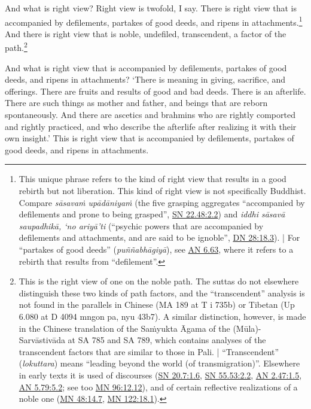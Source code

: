 \documentclass[12pt,openany]{book}%
\begin{document}
And what is right view? Right view is twofold, I say. There is right view that is accompanied by defilements, partakes of good deeds, and ripens in attachments.\footnote{This unique phrase refers to the kind of right view that results in a good rebirth but not liberation. This kind of right view is not specifically Buddhist. Compare \textit{\textsanskrit{sāsavaṁ} \textsanskrit{upādāniyaṁ}} (the five grasping aggregates “accompanied by defilements and prone to being grasped”, \href{https://suttacentral.net/sn22.48/en/sujato\#2.2}{SN 22.48:2.2}) and \textit{iddhi \textsanskrit{sāsavā} \textsanskrit{saupadhikā}, ‘no \textsanskrit{ariyā}’ti} (“psychic powers that are accompanied by defilements and attachments, and are said to be ignoble”, \href{https://suttacentral.net/dn28/en/sujato\#18.3}{DN 28:18.3}). | For “partakes of good deeds” (\textit{\textsanskrit{puññabhāgiyā}}), see \href{https://suttacentral.net/an6.63/en/sujato}{AN 6.63}, where it refers to a rebirth that results from “defilement”. } And there is right view that is noble, undefiled, transcendent, a factor of the path.\footnote{This is the right view of one on the noble path. The suttas do not elsewhere distinguish these two kinds of path factors, and the “transcendent” analysis is not found in the parallels in Chinese (MA 189 at T i 735b) or Tibetan (Up 6.080 at D 4094 mngon pa, nyu 43b7). A similar distinction, however, is made in the Chinese translation of the \textsanskrit{Saṁyukta} Āgama of the (\textsanskrit{Mūla})-\textsanskrit{Sarvāstivāda} at SA 785 and SA 789, which contains analyses of the transcendent factors that are similar to those in Pali. | “Transcendent” (\textit{lokuttara}) means “leading beyond the world (of transmigration)”. Elsewhere in early texts it is used of discourses (\href{https://suttacentral.net/sn20.7/en/sujato\#1.6}{SN 20.7:1.6}, \href{https://suttacentral.net/sn55.53/en/sujato\#2.2}{SN 55.53:2.2}, \href{https://suttacentral.net/an2.47/en/sujato\#1.5}{AN 2.47:1.5}, \href{https://suttacentral.net/an5.79/en/sujato\#5.2}{AN 5.79:5.2}; see too \href{https://suttacentral.net/mn96/en/sujato\#12.12}{MN 96:12.12}), and of certain reflective realizations of a noble one (\href{https://suttacentral.net/mn48/en/sujato\#14.7}{MN 48:14.7}, \href{https://suttacentral.net/mn122/en/sujato\#18.1}{MN 122:18.1}). } 

And what is right view that is accompanied by defilements, partakes of good deeds, and ripens in attachments? ‘There is meaning in giving, sacrifice, and offerings. There are fruits and results of good and bad deeds. There is an afterlife. There are such things as mother and father, and beings that are reborn spontaneously. And there are ascetics and brahmins who are rightly comported and rightly practiced, and who describe the afterlife after realizing it with their own insight.’ This is right view that is accompanied by defilements, partakes of good deeds, and ripens in attachments. 
\end{document}

